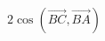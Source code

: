 \documentclass[preview]{standalone}
\begin{document}
\begin{align*}
2\cos\left(\overrightarrow{BC}, \overrightarrow{BA}\right)
\end{align*}
\end{document}
